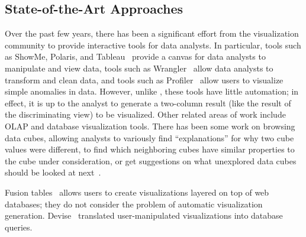 \subsection{State-of-the-Art Approaches}
\label{related_work}

Over the past few years, there has been a significant
effort from the visualization community to provide interactive tools
for data analysts. In particular, tools such as ShowMe, Polaris, and
Tableau~\cite{DBLP:journals/cacm/StolteTH08,
  DBLP:journals/tvcg/MackinlayHS07} provide a canvas for data analysts
to manipulate and view data, tools such as
Wrangler~\cite{DBLP:conf/chi/KandelPHH11} allow data analysts to
transform and clean data, and tools such as
Profiler~\cite{DBLP:conf/avi/KandelPPHH12} allow users to visualize
simple anomalies in data.  However, unlike \SeeDB, these tools have
little automation; in effect, it is up to the analyst to generate a
two-column result (like the result of the discriminating view)
to be visualized. Other related areas of work include OLAP and database
visualization tools. There has been some work on browsing data cubes, allowing
analysts to variously find ``explanations'' for why two cube values were
different, to find which neighboring cubes have similar properties to the cube
under consideration, or get suggestions on what unexplored data cubes should be
looked at next~\cite{DBLP:conf/vldb/Sarawagi99, DBLP:conf/vldb/SatheS01,
DBLP:conf/vldb/Sarawagi00}.

Fusion tables~\cite{DBLP:conf/sigmod/GonzalezHJLMSSG10} allows users to create
visualizations layered on top of web databases; they do not consider the problem
of automatic visualization generation.
Devise~\cite{DBLP:conf/sigmod/LivnyRBCDLMW97} translated user-manipulated
visualizations into database queries.



